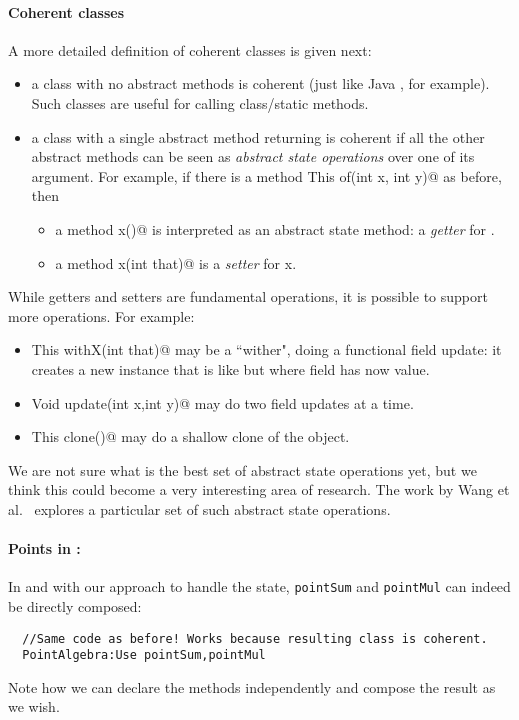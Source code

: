 \paragraph{Coherent classes} A more detailed definition of coherent
classes is given next:
\begin{itemize}
\item a class with no abstract methods is coherent (just like Java
  \Q@Math@, for example). Such classes are useful for calling class/static methods.
\item a class with a single abstract \Q@class@ method returning \Q@This@
is coherent if all the other abstract methods can be seen as \emph{abstract state
operations} over one of its argument.
For example,
if there is a \Q@class method This of(int x, int y)@ as before,
then
\begin{itemize}
\item a method \Q@int x()@ is interpreted as an abstract state method: a \emph{getter} for \Q@x@.
\item a method \Q@Void x(int that)@ is a \emph{setter} for x.
\end{itemize}
\end{itemize}
\noindent
While getters and setters are fundamental operations, it is possible to
support more operations. For example:
\begin{itemize}
\item \Q@method This withX(int that)@
may be a ``wither", doing a functional field update: it creates a new instance that is like \Q@this@ but where field \Q@x@ has now \Q@that@ value.
\item \Q@method Void update(int x,int y)@
may do two field updates at a time.
\item\Q@method This clone()@ may do a shallow clone of the object.
\end{itemize}

We are not sure what is the best set of abstract state operations yet,
but we think this could become a very interesting area of research.
The work by Wang et al.~\cite{wang2016classless} explores a particular
set of such abstract state operations.

\paragraph{Points in \name:}
In \name and with our approach to handle the state, 
\lstinline{pointSum} and \lstinline{pointMul} can indeed be directly composed:
\saveSpace
\begin{lstlisting}
  //Same code as before! Works because resulting class is coherent.
  PointAlgebra:Use pointSum,pointMul 
\end{lstlisting}  
\saveSpace
\noindent
  Note how we can declare the methods independently and compose the result
  as we wish. 

